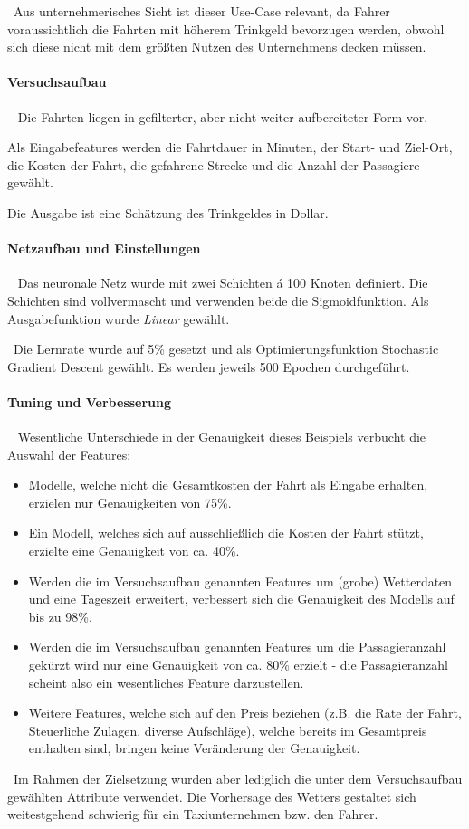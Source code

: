 ~\newline Aus unternehmerisches Sicht ist dieser Use-Case relevant, da Fahrer voraussichtlich die Fahrten mit höherem Trinkgeld bevorzugen werden, obwohl sich diese nicht mit dem größten Nutzen des Unternehmens decken müssen. 
\paragraph{Versuchsaufbau} ~\newline
Die Fahrten liegen in gefilterter, aber nicht weiter aufbereiteter Form vor. 

Als Eingabefeatures werden die Fahrtdauer in Minuten, der Start- und Ziel-Ort, die Kosten der Fahrt, die gefahrene Strecke und die Anzahl der Passagiere gewählt. 

Die Ausgabe ist eine Schätzung des Trinkgeldes in Dollar.
\paragraph{Netzaufbau und Einstellungen} ~\newline
Das neuronale Netz wurde mit zwei Schichten á 100 Knoten definiert. Die Schichten sind vollvermascht und verwenden beide die Sigmoidfunktion. Als Ausgabefunktion wurde \textit{Linear} gewählt.

~\newline Die Lernrate wurde auf 5\% gesetzt und als Optimierungsfunktion Stochastic Gradient Descent gewählt. Es werden jeweils 500 Epochen durchgeführt. 
\paragraph{Tuning und Verbesserung} ~\newline
Wesentliche Unterschiede in der Genauigkeit dieses Beispiels verbucht die Auswahl der Features:
\begin{itemize}
	\item Modelle, welche nicht die Gesamtkosten der Fahrt als Eingabe erhalten, erzielen nur Genauigkeiten von 75\%.
	\item Ein Modell, welches sich auf ausschließlich die Kosten der Fahrt stützt, erzielte eine Genauigkeit von ca. 40\%. 
	\item Werden die im Versuchsaufbau genannten Features um (grobe) Wetterdaten und eine Tageszeit erweitert, verbessert sich die Genauigkeit des Modells auf bis zu 98\%. 
	\item Werden die im Versuchsaufbau genannten Features um die Passagieranzahl gekürzt wird nur eine Genauigkeit von ca. 80\% erzielt - die Passagieranzahl scheint also ein wesentliches Feature darzustellen.
	\item Weitere Features, welche sich auf den Preis beziehen (z.B. die Rate der Fahrt, Steuerliche Zulagen, diverse Aufschläge), welche bereits im Gesamtpreis enthalten sind, bringen keine Veränderung der Genauigkeit. 
\end{itemize} 
~\newline Im Rahmen der Zielsetzung wurden aber lediglich die unter dem Versuchsaufbau gewählten Attribute verwendet. Die Vorhersage des Wetters gestaltet sich weitestgehend schwierig für ein Taxiunternehmen bzw. den Fahrer. 

